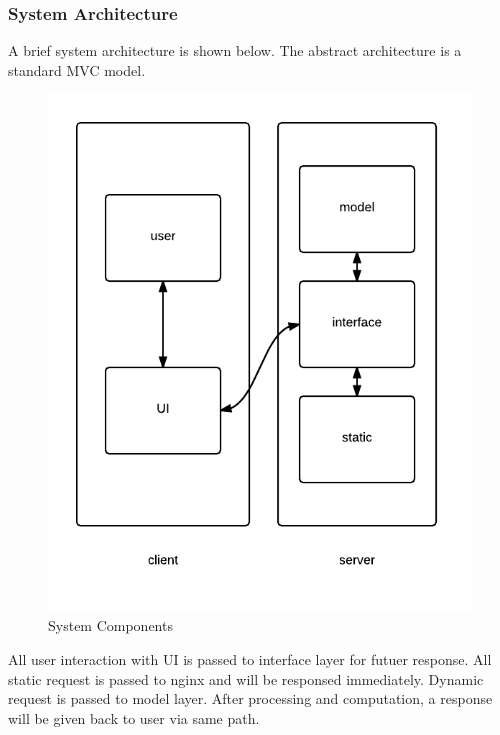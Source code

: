 \documentclass[twoside,11pt]{article}
\begin{document}

    \subsubsection{System Architecture} %
    \label{ssub:system_architecture}
        A brief system architecture is shown below. The abstract architecture is a standard MVC model.
    
         \begin{figure}[htbp]
             \centering
             \includegraphics[width=0.95\linewidth]{architecture.png}
             \caption{System Components}
             \label{fig:system_components}
         \end{figure}

        All user interaction with UI is passed to interface layer for futuer response. All static request is passed to nginx and will be responsed immediately. Dynamic request is passed to model layer. After processing and computation, a response will be given back to user via same path.
\end{document}
